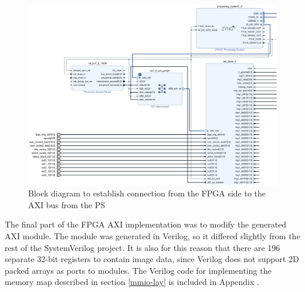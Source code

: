 \begin{figure}
	\centering 
	\includegraphics[width=\textwidth]{figures/fpga_axi_block}
	\caption{Block diagram to establish connection from the FPGA side to the AXI bus from the PS}\label{system-bd}
\end{figure}

The final part of the FPGA AXI implementation was to modify the generated AXI module. The module was generated in Verilog, so it differed slightly from the rest of the SystemVerilog project. It is also for this reason that there are 196 separate 32-bit registers to contain image data, since Verilog does not support 2D packed arrays as ports to modules. The Verilog code for implementing the memory map described in section \ref{mmio-lay} is included in Appendix .

